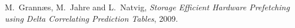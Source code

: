 \documentclass[12pt,journal,compsoc]{IEEEtran}
\begin{document}


\ifCLASSOPTIONcompsoc
\else
\fi


\ifCLASSOPTIONcaptionsoff
  \newpage
\fi



\begin{thebibliography}{1}

M.~Grann\ae s, M.~Jahre and L.~Natvig, \emph{Storage Efficient Hardware Prefetching using Delta Correlating Prediction Tables}, 2009.

\end{thebibliography}



\end{document}
